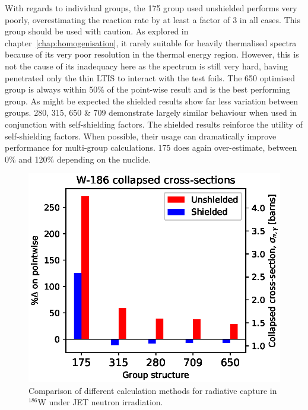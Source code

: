 With regards to individual groups, the 175 group used unshielded performs very poorly, overestimating the reaction rate by at least a factor of 3 in all cases. This group should be used with caution. As explored in chapter~\ref{chap:homogenisation}, it rarely suitable for heavily thermalised spectra because of its very poor resolution in the thermal energy region. However, this is not the cause of its inadequacy here as the spectrum is still very hard, having penetrated only the thin LTIS to interact with the test foils. The 650 optimised group is always within 50\% of the point-wise result and is the best performing group. As might be expected the shielded results show far less variation between groups. 280, 315, 650 \& 709 demonstrate largely similar behaviour when used in conjunction with self-shielding factors. The shielded results reinforce the utility of self-shielding factors. When possible, their usage can dramatically improve performance for multi-group calculations. 175 does again over-estimate, between 0\% and 120\% depending on the nuclide.

\begin{figure}[H]
  \centering
  \includegraphics[width=0.8\linewidth]{W-186.eps}
  \caption{Comparison of different calculation methods for radiative capture in $^{186}$W under JET neutron irradiation.}
  \label{fig:tungsten-186}
\end{figure}


